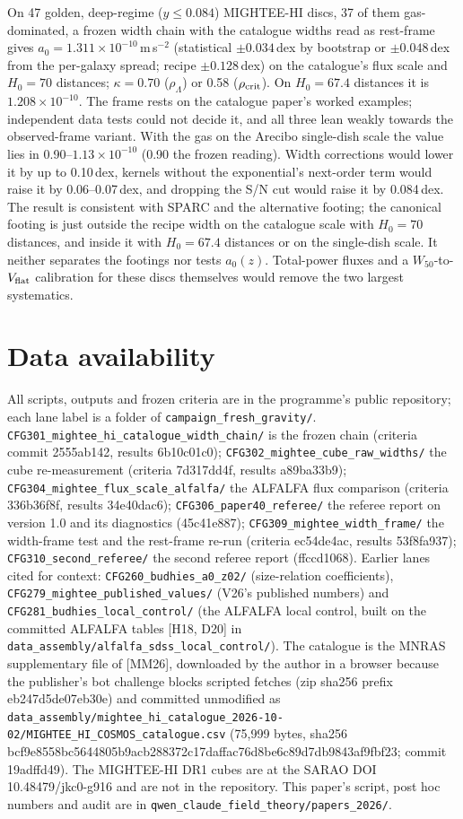 \documentclass[10pt]{article}
\newcommand{\fpath}[1]{\nolinkurl{#1}}
\begin{document}
On 47 golden, deep-regime ($y\le0.084$) MIGHTEE-HI discs, 37 of them gas-dominated, a frozen width chain with the catalogue widths read as rest-frame gives $a_0=1.311\times10^{-10}$\,m\,s$^{-2}$ (statistical $\pm0.034$\,dex by bootstrap or $\pm0.048$\,dex from the per-galaxy spread; recipe $\pm0.128$\,dex) on the catalogue's flux scale and $H_0=70$ distances; $\kappa=0.70$ ($\rho_\Lambda$) or 0.58 ($\rho_{\rm crit}$). On $H_0=67.4$ distances it is $1.208\times10^{-10}$. The frame rests on the catalogue paper's worked examples; independent data tests could not decide it, and all three lean weakly towards the observed-frame variant. With the gas on the Arecibo single-dish scale the value lies in 0.90--$1.13\times10^{-10}$ (0.90 the frozen reading). Width corrections would lower it by up to 0.10\,dex, kernels without the exponential's next-order term would raise it by 0.06--0.07\,dex, and dropping the S/N cut would raise it by 0.084\,dex. The result is consistent with SPARC and the alternative footing; the canonical footing is just outside the recipe width on the catalogue scale with $H_0=70$ distances, and inside it with $H_0=67.4$ distances or on the single-dish scale. It neither separates the footings nor tests $a_0(z)$. Total-power fluxes and a $W_{50}$-to-$V_{\rm flat}$ calibration for these discs themselves would remove the two largest systematics.

\section*{Data availability}
All scripts, outputs and frozen criteria are in the programme's public repository; each lane label is a folder of \fpath{campaign_fresh_gravity/}. \fpath{CFG301_mightee_hi_catalogue_width_chain/} is the frozen chain (criteria commit 2555ab142, results 6b10c01c0); \fpath{CFG302_mightee_cube_raw_widths/} the cube re-measurement (criteria 7d317dd4f, results a89ba33b9); \fpath{CFG304_mightee_flux_scale_alfalfa/} the ALFALFA flux comparison (criteria 336b36f8f, results 34e40dac6); \fpath{CFG306_paper40_referee/} the referee report on version 1.0 and its diagnostics (45c41e887); \fpath{CFG309_mightee_width_frame/} the width-frame test and the rest-frame re-run (criteria ec54de4ac, results 53f8fa937); \fpath{CFG310_second_referee/} the second referee report (ffccd1068). Earlier lanes cited for context: \fpath{CFG260_budhies_a0_z02/} (size-relation coefficients), \fpath{CFG279_mightee_published_values/} (V26's published numbers) and \fpath{CFG281_budhies_local_control/} (the ALFALFA local control, built on the committed ALFALFA tables [H18, D20] in \fpath{data_assembly/alfalfa_sdss_local_control/}). The catalogue is the MNRAS supplementary file of [MM26], downloaded by the author in a browser because the publisher's bot challenge blocks scripted fetches (zip sha256 prefix eb247d5de07eb30e) and committed unmodified as \fpath{data_assembly/mightee_hi_catalogue_2026-10-02/MIGHTEE_HI_COSMOS_catalogue.csv} (75,999 bytes, sha256 bcf9e8558bc5644805b9acb288372c17daffac76d8be6c89d7db9843af9fbf23; commit 19adffd49). The MIGHTEE-HI DR1 cubes are at the SARAO DOI 10.48479/jkc0-g916 and are not in the repository. This paper's script, post hoc numbers and audit are in \fpath{qwen_claude_field_theory/papers_2026/}.
\end{document}
